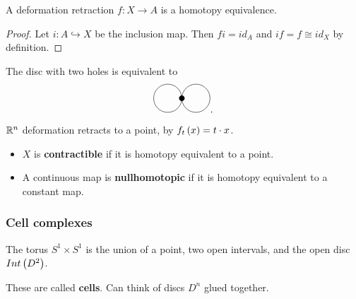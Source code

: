 \begin{lemma}
A deformation retraction $ f : X \to A $ is a homotopy equivalence.
\end{lemma}

\begin{proof}
Let $ i : A \hookrightarrow X $ be the inclusion map. Then $ fi = id_A $ and $ if = f \cong id_X $ by definition.
\end{proof}

\begin{example*}
The disc with two holes is equivalent to
$$
\begin{tikzpicture}
\fill (0, 0) circle (0.1);
\draw (-0.5, 0) circle (0.5);
\draw (0.5, 0) circle (0.5);
\end{tikzpicture}.
$$
\end{example*}

\begin{example*}
$ \mathbb{R}^n $ deformation retracts to a point, by $ f_t\br{x} = t \cdot x $.
\end{example*}

\begin{definition*}
\hfill
\begin{itemize}
\item $ X $ is \textbf{contractible} if it is homotopy equivalent to a point.
\item A continuous map is \textbf{nullhomotopic} if it is homotopy equivalent to a constant map.
\end{itemize}
\end{definition*}

\pagebreak

\subsubsection{Cell complexes}

\begin{example*}
The torus $ S^1 \times S^1 $ is the union of a point, two open intervals, and the open disc $ Int\br{D^2} $.
\end{example*}

These are called \textbf{cells}. Can think of discs $ D^n $ glued together.



